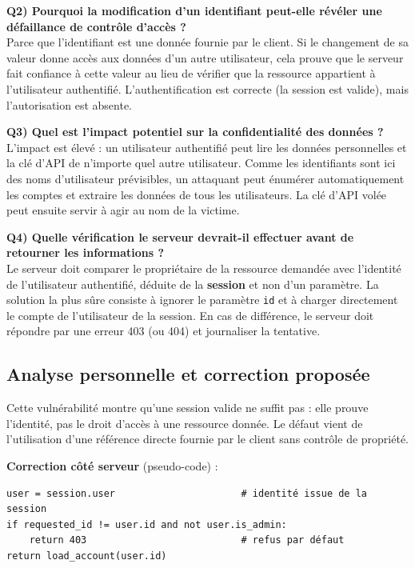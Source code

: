 \documentclass{rapportENSIAS}
\begin{document}
\textbf{Q2) Pourquoi la modification d'un identifiant peut-elle révéler une défaillance de contrôle d'accès ?}\\
Parce que l'identifiant est une donnée fournie par le client. Si le changement de sa valeur donne accès aux données d'un autre utilisateur, cela prouve que le serveur fait confiance à cette valeur au lieu de vérifier que la ressource appartient à l'utilisateur authentifié. L'authentification est correcte (la session est valide), mais l'autorisation est absente.

\textbf{Q3) Quel est l'impact potentiel sur la confidentialité des données ?}\\
L'impact est élevé : un utilisateur authentifié peut lire les données personnelles et la clé d'API de n'importe quel autre utilisateur. Comme les identifiants sont ici des noms d'utilisateur prévisibles, un attaquant peut énumérer automatiquement les comptes et extraire les données de tous les utilisateurs. La clé d'API volée peut ensuite servir à agir au nom de la victime.

\textbf{Q4) Quelle vérification le serveur devrait-il effectuer avant de retourner les informations ?}\\
Le serveur doit comparer le propriétaire de la ressource demandée avec l'identité de l'utilisateur authentifié, déduite de la \textbf{session} et non d'un paramètre. La solution la plus sûre consiste à ignorer le paramètre \texttt{id} et à charger directement le compte de l'utilisateur de la session. En cas de différence, le serveur doit répondre par une erreur 403 (ou 404) et journaliser la tentative.

\subsection{Analyse personnelle et correction proposée}

Cette vulnérabilité montre qu'une session valide ne suffit pas : elle prouve l'identité, pas le droit d'accès à une ressource donnée. Le défaut vient de l'utilisation d'une référence directe fournie par le client sans contrôle de propriété.

\textbf{Correction côté serveur} (pseudo-code) :
\begin{verbatim}
user = session.user                      # identité issue de la session
if requested_id != user.id and not user.is_admin:
    return 403                           # refus par défaut
return load_account(user.id)
\end{verbatim}
\end{document}
